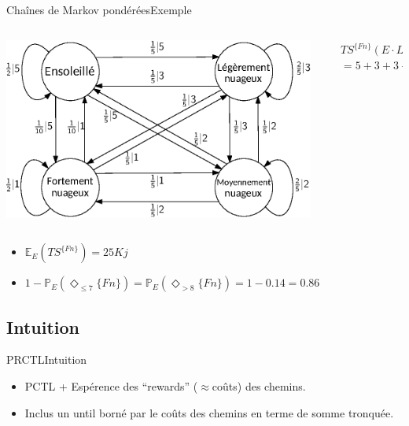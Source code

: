 \documentclass[compress]{beamer}
\begin{document}
\begin{frame}{Chaînes de Markov pondérées}{Exemple}
  \begin{columns}
    \begin{column}{0.5\linewidth}
      \includegraphics[width=\linewidth]{resources/weather}
    \end{column}
    \begin{column}{0.5\linewidth}
        \begin{align*}
          &TS^{\{Fn\}}(E \cdot Ln \cdot Ln \cdot Mn \cdot Fn\, \dots)& \\
          &= 5+3+3+2 = 13&
        \end{align*}
    \end{column}
  \end{columns}
  \begin{itemize}
    \item $\mathbb{E}_{E}(TS^{\{Fn\}}) = 25 Kj$
    \item $1 - \mathbb{P}_{E}(\Diamond_{\leq 7}\{Fn\}) =
      \mathbb{P}_{E}(\Diamond_{> 8}\{Fn\}) = 1 - 0.14 = 0.86 $
  \end{itemize}
\end{frame}

\subsection{Intuition}
\begin{frame}{PRCTL}{Intuition}
  \begin{itemize}
    \item PCTL + Espérence des ``rewards'' ($\approx$coûts) des chemins.
    \item Inclus un until borné par le coûts des chemins en terme de somme tronquée.
  \end{itemize}
\end{frame}
\end{document}
